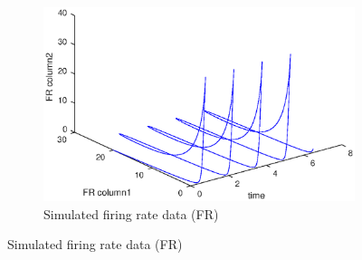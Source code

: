 \begin{figure}[H]
        \centering
        \begin{subfigure}[b]{0.475\textwidth}
            \centering
            \includegraphics[width=\textwidth]{./images/FinalOralPlots/SyntheticOralPaper/SimFiringRate-with-Time.eps}
            \caption[]%
            {{\small Simulated firing rate data (FR)}}  
               

\end{subfigure}
\end{figure}
